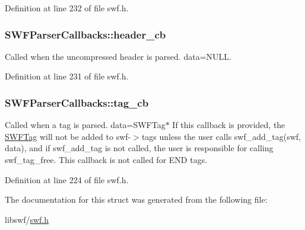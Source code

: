 Definition at line 232 of file swf.\-h.

\hypertarget{struct_s_w_f_parser_callbacks_a894666f68df70f79b7b2bed33cccf498}{
\subsubsection[{header\-\_\-cb}]{ S\-W\-F\-Parser\-Callbacks\-::header\-\_\-cb}}\label{struct_s_w_f_parser_callbacks_a894666f68df70f79b7b2bed33cccf498}


Called when the uncompressed header is parsed. data=N\-U\-L\-L. 



Definition at line 231 of file swf.\-h.

\hypertarget{struct_s_w_f_parser_callbacks_a898af2d0db9d2d038e4d9c039ea91ac2}{
\subsubsection[{tag\-\_\-cb}]{ S\-W\-F\-Parser\-Callbacks\-::tag\-\_\-cb}}\label{struct_s_w_f_parser_callbacks_a898af2d0db9d2d038e4d9c039ea91ac2}
Called when a tag is parsed. data=S\-W\-F\-Tag$\ast$ If this callback is provided, the \hyperlink{struct_s_w_f_tag}{S\-W\-F\-Tag} will not be added to swf-\/$>$tags unless the user calls swf\-\_\-add\-\_\-tag(swf, data), and if swf\-\_\-add\-\_\-tag is not called, the user is responsible for calling swf\-\_\-tag\-\_\-free. This callback is not called for E\-N\-D tags. 

Definition at line 224 of file swf.\-h.



The documentation for this struct was generated from the following file\-:\begin{DoxyCompactItemize}
\item 
libswf/\hyperlink{swf_8h}{swf.\-h}\end{DoxyCompactItemize}
